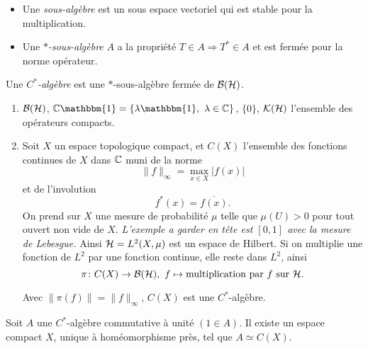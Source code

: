 \begin{defi}
  \begin{itemize}
  \item Une \emph{sous-algèbre} est un sous espace vectoriel qui est stable pour la
    multiplication.
  \item Une \emph{$\ast$-sous-algèbre} $A$ a la propriété $T \in A \Rightarrow
    T^\ast \in A$ et est fermée pour la norme opérateur.
  \end{itemize}

\end{defi}

\begin{defi}
  Une \emph{$C^\ast$-algèbre} est une $\ast$-sous-algèbre fermée de $\mathcal{B}(\mathcal{H})$.
\end{defi}

\begin{exs}
  \begin{enumerate}
  \item $\mathcal{B}(\mathcal{H})$, $\C \mathbbm{1} = \{\lambda \mathbbm{1},\ \lambda \in \C\}$, $\{0\}$, $\mathcal{K}(\mathcal{H})$ l'ensemble des opérateurs
    compacts.
  \item Soit $X$ un espace topologique compact, et $C(X)$ l'ensemble des fonctions continues de $X$ dans $\mathbb{C}$
    muni de la norme 
    \[ \|f\|_{\infty} = \max_{x \in X} |f(x)| \]
    et de l'involution 
    \[ f^\ast(x) = \overline{f(x)}. \]
    On prend sur $X$ une mesure de probabilité $\mu$ telle que $\mu(U) > 0$ pour tout ouvert non vide de
    $X$. \textit{L'exemple a garder en tête est $[0,1]$ avec la mesure de Lebesgue.} Ainsi $\mathcal{H} = L^2(X, \mu)$
    est un espace de Hilbert. Si on multiplie une fonction de $L^2$ par une fonction continue, elle reste dans
    $L^2$, ainsi 
    \[ \pi \colon C(X) \to \mathcal{B}(\mathcal{H}),\ f \mapsto \text{multiplication par $f$ sur } \mathcal{H}. \]
    \begin{exercice}
      Avec $\|\pi(f)\| = \|f\|_\infty$, $C(X)$ est une $C^\ast$-algèbre.
    \end{exercice}
  \end{enumerate}
\end{exs}

\begin{theo}[Gelfand, 1940]
  Soit $A$ une $C^\ast$-algèbre commutative à unité $(1 \in A)$. Il existe un espace compact $X$, unique à
  homéomorphisme près, tel que $A \simeq C(X)$.
\end{theo}


